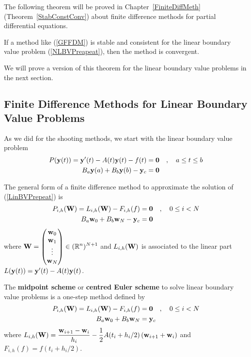 The following theorem will be proved in Chapter~\ref{FiniteDiffMeth}
(Theorem~\ref{StabConstConv}) about finite difference methods for
partial differential equations.

\begin{theorem}
If a method like (\ref{GFFDM}) is stable and consistent for the
linear boundary value problem (\ref{NLBVPreapeat}), then the method is
convergent.
\label{SCssiC}
\end{theorem}

We will prove a version of this theorem for the linear boundary value
problems in the next section.

\subsection{Finite Difference Methods for Linear Boundary Value
Problems}

As we did for the shooting methods, we start with the linear boundary
value problem
\begin{equation}\label{LinBVPrepeat}
\begin{split}
P(\mathbf{y}(t)) = \mathbf{y}'(t) - A(t)\mathbf{y}(t) - f(t) &= \mathbf{0}
\quad , \quad a \leq t \leq b \\
B_a\mathbf{y}(a) + B_b\mathbf{y}(b) - \mathbf{y}_c &= \mathbf{0}
\end{split}
\end{equation}

The general form of a finite difference method to approximate the solution of
(\ref{LinBVPrepeat}) is
\begin{equation} \label{LGFFDM}
\begin{split}
P_{i,h}(\mathbf{W}) = L_{i,h}(\mathbf{W}) - F_{i,h}(f) &= \mathbf{0} 
\quad , \quad 0 \leq i < N \\
B_a\mathbf{w}_0 + B_b\mathbf{w}_N - \mathbf{y}_c &= \mathbf{0}
\end{split}
\end{equation}
where
$\displaystyle \mathbf{W} =
\begin{pmatrix} \mathbf{w}_0 \\ \mathbf{w}_1 \\ \vdots \\ \mathbf{w}_N \end{pmatrix}
\in (\mathbb{R}^n)^{N+1}$ and
$L_{i,h}(\mathbf{W})$ is associated to the linear part
$L(\mathbf{y}(t)) = \mathbf{y}'(t) - A(t)\mathbf{y}(t)$.

\begin{egg}
The
{\bfseries midpoint scheme}
or
{\bfseries centred Euler scheme}
to solve linear boundary value problems is a one-step method defined by
\begin{align*}
P_{i,h}(\mathbf{W}) = L_{i,h}(\mathbf{W}) - F_{i,h}(f) &= \mathbf{0} \quad ,
\quad 0 \leq i < N \\
B_a\mathbf{w}_0 + B_b\mathbf{w}_N &= \mathbf{y}_c
\end{align*}
where
$\displaystyle L_{i,h}(\mathbf{W})
= \frac{\mathbf{w}_{i+1} - \mathbf{w}_i}{h_i} - \frac{1}{2}
A(t_i+h_i/2) \left( \mathbf{w}_{i+1} + \mathbf{w}_i\right)$
and
$\displaystyle F_{i,h}(f) = f(t_i+h_i/2)$.
\label{eggmidpointscheme}
\end{egg}

